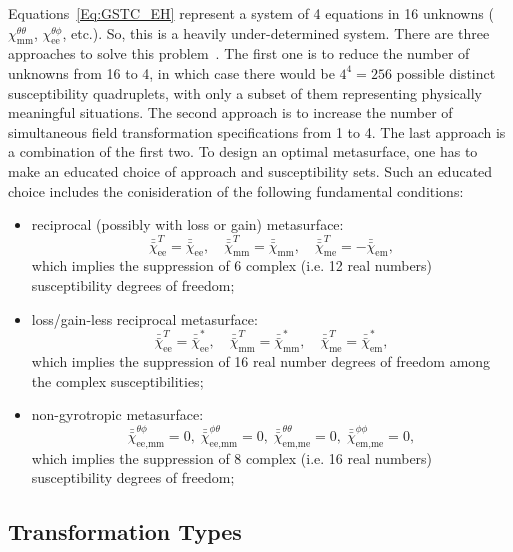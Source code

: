 \documentclass[journal,transaction]{IEEEtran}
\begin{document}
Equations~\eqref{Eq:GSTC_EH} represent a system of 4 equations in 16 unknowns ($\chi^{\theta \theta}_\text{mm}$, $\chi^{\theta\phi}_\text{ee}$, etc.). So, this is a heavily under-determined system. There are three approaches to solve this problem~\cite{2017_12_Achouri_Nanophotonics}. The first one is to reduce the number of unknowns from 16 to 4, in which case there would be $4^4=256$ possible distinct susceptibility quadruplets, with only a subset of them representing physically meaningful situations. The second approach is to increase the number of simultaneous field transformation specifications from 1 to 4. The last approach is a combination of the first two. To design an optimal metasurface, one has to make an educated choice of approach and susceptibility sets. Such an educated choice includes the conisideration of the following fundamental conditions:
%
\begin{itemize}
  \item reciprocal (possibly with loss or gain) metasurface:
\begin{equation}\label{reciprocity}
\bar{\bar{\chi}}_\text{ee}^T=\bar{\bar{\chi}}_\text{ee},\quad
\bar{\bar{\chi}}_\text{mm}^T=\bar{\bar{\chi}}_\text{mm},\quad
\bar{\bar{\chi}}_\text{me}^T=-\bar{\bar{\chi}}_\text{em},
   \end{equation}
which implies the suppression of 6 complex (i.e. 12 real numbers) susceptibility degrees of freedom;
\item loss/gain-less reciprocal metasurface:
   \begin{equation}\label{passive_lossless_reciprocal}
\bar{\bar{\chi}}_\text{ee}^T=\bar{\bar{\chi}}_\text{ee}^*,\quad
\bar{\bar{\chi}}_\text{mm}^T=\bar{\bar{\chi}}_\text{mm}^*, \quad
\bar{\bar{\chi}}_\text{me}^T=\bar{\bar{\chi}}_\text{em}^*,
     \end{equation}
which implies the suppression of 16 real number degrees of freedom among the complex susceptibilities;
\item non-gyrotropic metasurface:
 \begin{equation}\label{non-gyrotropy}
\bar{\bar{\chi}}_\text{ee,mm}^{\theta\phi}=0,\;
\bar{\bar{\chi}}_\text{ee,mm}^{\phi\theta}=0,\;
\bar{\bar{\chi}}_\text{em,me}^{\theta\theta}=0,\;
\bar{\bar{\chi}}_\text{em,me}^{\phi\phi}=0,
      \end{equation}
which implies the suppression of 8 complex (i.e. 16 real numbers) susceptibility degrees of freedom;
\end{itemize}

\subsection{Transformation Types}
\end{document}
